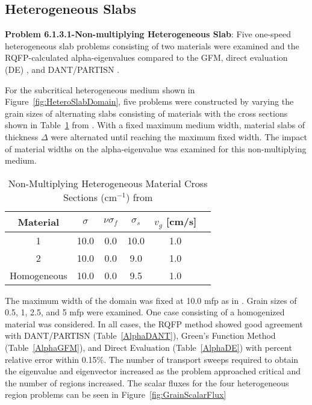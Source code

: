 \clearpage

\subsection{Heterogeneous Slabs}

\textbf{Problem 6.1.3.1-Non-multiplying Heterogeneous Slab}: Five one-speed heterogeneous slab problems consisting of two materials were examined and the RQFP-calculated alpha-eigenvalues compared to the GFM, direct evaluation (DE) \cite{modak_simple_2003}, and DANT/PARTISN \cite{alcouffe2005partisn}. 

For the subcritical heterogeneous medium shown in Figure~\ref{fig:HeteroSlabDomain}, five problems were constructed by varying the grain sizes of alternating slabs consisting of materials with the cross sections shown in Table~\ref{table:BetzlerHetero} from \cite{kornreich_timeeigenvalue_2005}. With a fixed maximum medium width, material slabs of thickness $\Delta$ were alternated until reaching the maximum fixed width. The impact of material widths on the alpha-eigenvalue was examined for this non-multiplying medium.

\begin{table}[!htbp]
    \centering
    \caption{Non-Multiplying Heterogeneous Material Cross Sections (cm$^{-1}$) from \cite{kornreich_timeeigenvalue_2005}}
\label{table:BetzlerHetero}
    \begin{tabular}{*6c}
        \toprule
	Material & $\sigma$ & $\nu \sigma_{f}$ & $\sigma_{s}$ & $v_{g}$ [cm/s] \\ 
        \midrule
	1 & 10.0 & 0.0 & 10.0 & 1.0 \\
	2 & 10.0 & 0.0 & 9.0 & 1.0 \\
	Homogeneous & 10.0 & 0.0 & 9.5 & 1.0 \\
        \bottomrule
    \end{tabular}
\end{table}

 The maximum width of the domain was fixed at 10.0 mfp as in \cite{kornreich_timeeigenvalue_2005}. Grain sizes of 0.5, 1, 2.5, and 5 mfp were examined. One case consisting of a homogenized material was considered. In all cases, the RQFP method showed good agreement with DANT/PARTISN (Table~\ref{AlphaDANT}), Green's Function Method (Table~\ref{AlphaGFM}), and Direct Evaluation (Table~\ref{AlphaDE}) with percent relative error within 0.15\%. The number of transport sweeps required to obtain the eigenvalue and eigenvector increased as the problem approached critical and the number of regions increased. The scalar fluxes for the four heterogeneous region problems can be seen in Figure~\ref{fig:GrainScalarFlux}

